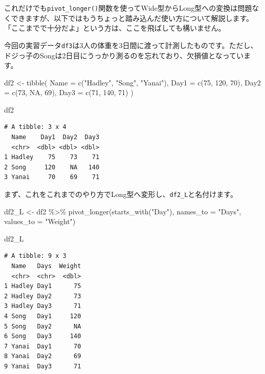 \documentclass[
  a4paper,
  pandoc,
  ja=standard,
  jafont=haranoaji]{bxjsbook}
\newenvironment{Shaded}{\begin{snugshade}}{\end{snugshade}}
\newcommand{\AttributeTok}[1]{\textcolor[rgb]{0.00,0.48,0.65}{#1}}
\newcommand{\ConstantTok}[1]{\textcolor[rgb]{0.56,0.35,0.01}{#1}}
\newcommand{\DecValTok}[1]{\textcolor[rgb]{0.68,0.00,0.00}{#1}}
\newcommand{\FunctionTok}[1]{\textcolor[rgb]{0.28,0.35,0.67}{#1}}
\newcommand{\NormalTok}[1]{\textcolor[rgb]{0.00,0.48,0.65}{#1}}
\newcommand{\OtherTok}[1]{\textcolor[rgb]{0.00,0.48,0.65}{#1}}
\newcommand{\SpecialCharTok}[1]{\textcolor[rgb]{0.37,0.37,0.37}{#1}}
\newcommand{\StringTok}[1]{\textcolor[rgb]{0.13,0.47,0.30}{#1}}
\begin{document}
これだけでも\texttt{pivot\_longer()}関数を使ってWide型からLong型への変換は問題なくできますが、以下ではもうちょっと踏み込んだ使い方について解説します。「ここまでで十分だよ」という方は、ここを飛ばしても構いません。

今回の実習データ\texttt{df3}は3人の体重を3日間に渡って計測したものです。ただし、ドジっ子のSongは2日目にうっかり測るのを忘れており、欠損値となっています。

\begin{Shaded}
\begin{Highlighting}[numbers=left,,]
\NormalTok{df2 }\OtherTok{\textless{}{-}} \FunctionTok{tibble}\NormalTok{(}
  \AttributeTok{Name =} \FunctionTok{c}\NormalTok{(}\StringTok{"Hadley"}\NormalTok{, }\StringTok{"Song"}\NormalTok{, }\StringTok{"Yanai"}\NormalTok{),}
  \AttributeTok{Day1 =} \FunctionTok{c}\NormalTok{(}\DecValTok{75}\NormalTok{, }\DecValTok{120}\NormalTok{, }\DecValTok{70}\NormalTok{),}
  \AttributeTok{Day2 =} \FunctionTok{c}\NormalTok{(}\DecValTok{73}\NormalTok{,  }\ConstantTok{NA}\NormalTok{, }\DecValTok{69}\NormalTok{),}
  \AttributeTok{Day3 =} \FunctionTok{c}\NormalTok{(}\DecValTok{71}\NormalTok{, }\DecValTok{140}\NormalTok{, }\DecValTok{71}\NormalTok{)}
\NormalTok{)}

\NormalTok{df2}
\end{Highlighting}
\end{Shaded}

\begin{verbatim}
# A tibble: 3 x 4
  Name    Day1  Day2  Day3
  <chr>  <dbl> <dbl> <dbl>
1 Hadley    75    73    71
2 Song     120    NA   140
3 Yanai     70    69    71
\end{verbatim}

まず、これをこれまでのやり方でLong型へ変形し、\texttt{df2\_L}と名付けます。

\begin{Shaded}
\begin{Highlighting}[numbers=left,,]
\NormalTok{df2\_L }\OtherTok{\textless{}{-}}\NormalTok{ df2 }\SpecialCharTok{\%\textgreater{}\%}
  \FunctionTok{pivot\_longer}\NormalTok{(}\FunctionTok{starts\_with}\NormalTok{(}\StringTok{"Day"}\NormalTok{),}
               \AttributeTok{names\_to  =} \StringTok{"Days"}\NormalTok{,}
               \AttributeTok{values\_to =} \StringTok{"Weight"}\NormalTok{)}

\NormalTok{df2\_L}
\end{Highlighting}
\end{Shaded}

\begin{verbatim}
# A tibble: 9 x 3
  Name   Days  Weight
  <chr>  <chr>  <dbl>
1 Hadley Day1      75
2 Hadley Day2      73
3 Hadley Day3      71
4 Song   Day1     120
5 Song   Day2      NA
6 Song   Day3     140
7 Yanai  Day1      70
8 Yanai  Day2      69
9 Yanai  Day3      71
\end{verbatim}
\end{document}
